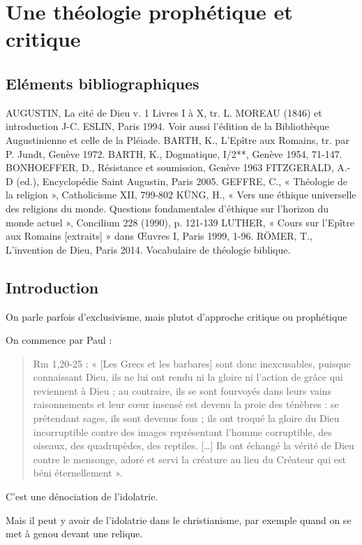 \chapter{Une théologie prophétique et critique}
\section{Eléments bibliographiques}
AUGUSTIN, La cité de Dieu v. 1 Livres I à X, tr. L. MOREAU (1846) et introduction J-C.
ESLIN, Paris 1994. Voir aussi l’édition de la Bibliothèque Augustinienne et celle de la
Pléiade.
BARTH, K., L’Epître aux Romains, tr. par P. Jundt, Genève 1972.
BARTH, K., Dogmatique, I/2**, Genève 1954, 71-147.
BONHOEFFER, D., Résistance et soumission, Genève 1963
FITZGERALD, A.-D (ed.), Encyclopédie Saint Augustin, Paris 2005.
GEFFRE, C., « Théologie de la religion », Catholicisme XII, 799-802
KÜNG, H., « Vers une éthique universelle des religions du monde. Questions fondamentales
d’éthique sur l’horizon du monde actuel », Concilium 228 (1990), p. 121-139
LUTHER, « Cours sur l’Epître aux Romains [extraits] » dans Œuvres I, Paris 1999, 1-96.
RÖMER, T., L’invention de Dieu, Paris 2014.
Vocabulaire de théologie biblique.


\section{Introduction}



  \begin{Def}[Exclusivisme]
 On parle parfois d'exclusivisme, 
 mais plutot d'approche critique ou prophétique
\end{Def}
 
 On commence par Paul :
 \begin{quote}
     Rm 1,20-25 : « [Les Grecs et les barbares] sont donc inexcusables, puisque connaissant Dieu, ils ne lui
ont rendu ni la gloire ni l’action de grâce qui reviennent à Dieu ; au contraire, ils se sont fourvoyés
dans leurs vains raisonnements et leur cœur insensé est devenu la proie des ténèbres : se prétendant
sages, ils sont devenus fous ; ils ont troqué la gloire du Dieu incorruptible contre des images
représentant l’homme corruptible, des oiseaux, des quadrupèdes, des reptiles. […] Ils ont échangé la
vérité de Dieu contre le mensonge, adoré et servi la créature au lieu du Créateur qui est béni
éternellement ».

 \end{quote}
C'est une dénociation de l'idolatrie.
\begin{Ex}
Mais il peut y avoir de l'idolatrie dans le christianisme, par exemple quand on se met à genou devant une relique.
\end{Ex}

